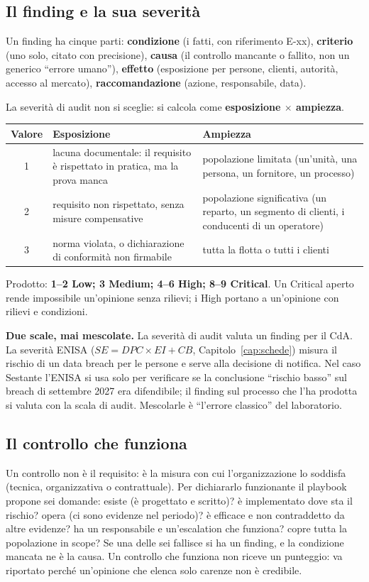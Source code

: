 \subsection{Il finding e la sua severità}
Un finding ha cinque parti: \textbf{condizione} (i fatti, con riferimento E-xx), \textbf{criterio}
(uno solo, citato con precisione), \textbf{causa} (il controllo mancante o fallito, non un generico
``errore umano''), \textbf{effetto} (esposizione per persone, clienti, autorità, accesso al mercato),
\textbf{raccomandazione} (azione, responsabile, data).

La severità di audit non si sceglie: si calcola come \textbf{esposizione $\times$ ampiezza}.
\begin{center}
\small
\begin{tabularx}{\linewidth}{c X X}
\toprule
\textbf{Valore} & \textbf{Esposizione} & \textbf{Ampiezza} \\ \midrule
1 & lacuna documentale: il requisito è rispettato in pratica, ma la prova manca &
  popolazione limitata (un'unità, una persona, un fornitore, un processo) \\
2 & requisito non rispettato, senza misure compensative & popolazione significativa (un reparto, un
  segmento di clienti, i conducenti di un operatore) \\
3 & norma violata, o dichiarazione di conformità non firmabile & tutta la flotta o tutti i clienti \\
\bottomrule
\end{tabularx}
\end{center}
Prodotto: \textbf{1--2 Low; 3 Medium; 4--6 High; 8--9 Critical}. Un Critical aperto rende impossibile
un'opinione senza rilievi; i High portano a un'opinione con rilievi e condizioni.

\begin{esame}
\textbf{Due scale, mai mescolate.} La severità di audit valuta un finding per il CdA. La severità
ENISA ($SE = DPC \times EI + CB$, Capitolo~\ref{cap:schede}) misura il rischio di un data breach per
le persone e serve alla decisione di notifica. Nel caso Sestante l'ENISA si usa solo per verificare
se la conclusione ``rischio basso'' sul breach di settembre 2027 era difendibile; il finding sul
processo che l'ha prodotta si valuta con la scala di audit. Mescolarle è ``l'errore classico'' del
laboratorio.
\end{esame}

\subsection{Il controllo che funziona}
Un controllo non è il requisito: è la misura con cui l'organizzazione lo soddisfa (tecnica,
organizzativa o contrattuale). Per dichiararlo funzionante il playbook propone sei domande: esiste
(è progettato e scritto)? è implementato dove sta il rischio? opera (ci sono evidenze nel periodo)?
è efficace e non contraddetto da altre evidenze? ha un responsabile e un'escalation che funziona?
copre tutta la popolazione in scope? Se una delle sei fallisce si ha un finding, e la condizione
mancata ne è la causa. Un controllo che funziona non riceve un punteggio: va riportato perché
un'opinione che elenca solo carenze non è credibile.

